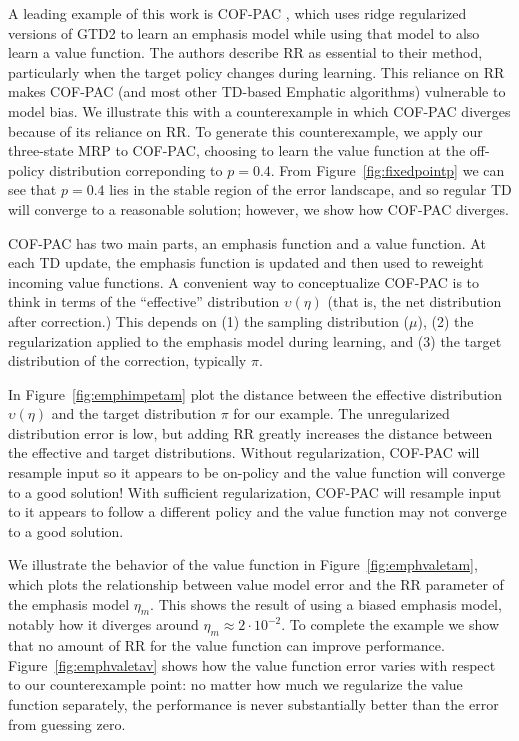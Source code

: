 \documentclass[11pt]{article}
\begin{document}
A leading example of this work is COF-PAC \cite{zhang2020provably}, which uses ridge regularized versions of GTD2 \cite{sutton2009fast} to learn an emphasis model while using that model to also learn a value function. The authors describe RR as essential to their method, particularly when the target policy changes during learning. This reliance on RR makes COF-PAC (and most other TD-based Emphatic algorithms) vulnerable to model bias.
We illustrate this with a counterexample in which COF-PAC diverges because of its reliance on RR.
To generate this counterexample, we apply our three-state MRP to COF-PAC, choosing to learn the value function at the off-policy distribution correponding to $p=0.4$. From Figure~\ref{fig:fixedpointp} we can see that $p=0.4$ lies in the stable region of the error landscape, and so regular TD will converge to a reasonable solution; however, we show how COF-PAC diverges.

COF-PAC has two main parts, an emphasis function and a value function. At each TD update, the emphasis function is updated and then used to reweight incoming value functions. A convenient way to conceptualize COF-PAC is to think in terms of the ``effective'' distribution $\upsilon(\eta)$ (that is, the net distribution after correction.) This depends on (1) the sampling distribution ($\mu$), (2) the regularization applied to the emphasis model during learning, and (3) the target distribution of the correction, typically $\pi$.

In Figure~\ref{fig:emphimpetam} plot the distance between the effective distribution $\upsilon(\eta)$ and the target distribution $\pi$ for our example. The unregularized distribution error is low, but adding RR greatly increases the distance between the effective and target distributions.
Without regularization, COF-PAC will resample input so it appears to be on-policy and the value function will converge to a good solution! With sufficient regularization, COF-PAC will resample input to it appears to follow a different policy and the value function may not converge to a good solution.

We illustrate the behavior of the value function in Figure~\ref{fig:emphvaletam}, which plots the relationship between value model error and the RR parameter of the emphasis model $\eta_m$. This shows the result of using a biased emphasis model, notably how it diverges around $\eta_m\approx 2\cdot 10^{-2}$. To complete the example we show that no amount of RR for the value function can improve performance. Figure~\ref{fig:emphvaletav} shows how the value function error varies with respect to our counterexample point: no matter how much we regularize the value function separately, the performance is never substantially better than the error from guessing zero.
\end{document}
